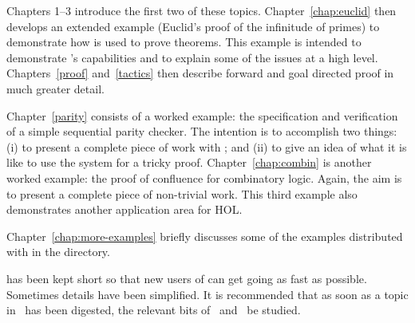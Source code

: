 Chapters 1--3 introduce the first two of these topics.
Chapter~\ref{chap:euclid} then develops an extended example (Euclid's
proof of the infinitude of primes) to demonstrate how \HOL{} is used
to prove theorems.  This example is intended to demonstrate \HOL{}'s
capabilities and to explain some of the issues at a high level.
Chapters~\ref{proof} and~\ref{tactics} then describe forward and goal
directed proof in much greater detail.

Chapter~\ref{parity} consists of a worked example: the specification
and verification of a simple sequential parity checker.  The intention
is to accomplish two things: (i) to present a complete piece of work
with \HOL; and (ii) to give an idea of what it is like to use the
\HOL{} system for a tricky proof.  Chapter~\ref{chap:combin} is
another worked example: the proof of confluence for combinatory logic.
Again, the aim is to present a complete piece of non-trivial work.
This third example also demonstrates another application area for HOL.

Chapter~\ref{chap:more-examples} briefly discusses some of the
examples distributed with \holn{} in the  directory.




\vspace{1cm}

\noindent \TUTORIAL{} has been kept short so that new users of \HOL{} can get
going as fast as possible. Sometimes details have been simplified. It
is recommended that as soon as a topic in \TUTORIAL\ has been
digested, the relevant bits of \DESCRIPTION\ and \REFERENCE\ be
studied.

